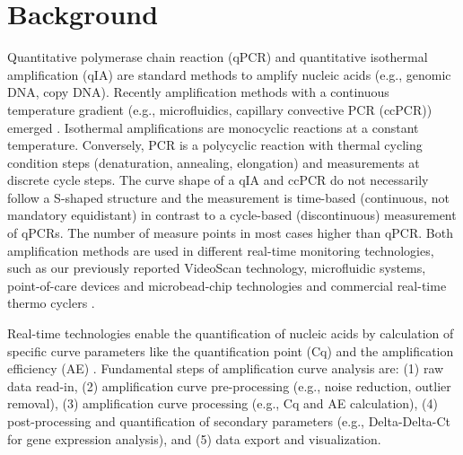\documentclass[twocolumn]{bmcart}%
\begin{document}

\section*{Background}

Quantitative polymerase chain reaction (qPCR) and quantitative isothermal 
amplification (qIA) are standard methods to amplify nucleic acids (e.g., genomic 
DNA, copy DNA). Recently amplification methods with a continuous temperature 
gradient (e.g., microfluidics, capillary convective PCR (ccPCR)) emerged 
\cite{bustin_miqe_2009, rodiger_nucleic_2014, chou_rapid_2011}. Isothermal 
amplifications are monocyclic reactions at a constant temperature. Conversely, 
PCR is a polycyclic reaction with thermal cycling condition steps (denaturation, 
annealing, elongation) and measurements at discrete cycle steps. The curve shape 
of a qIA and ccPCR do not necessarily follow a S-shaped structure and the 
measurement is time-based (continuous, not mandatory equidistant) in contrast to 
a cycle-based (discontinuous) measurement of qPCRs. The number of measure points 
in most cases higher than qPCR. Both amplification methods are used in different 
real-time monitoring technologies, such as our previously reported VideoScan 
technology, microfluidic systems, point-of-care devices and microbead-chip 
technologies and commercial real-time thermo cyclers \cite{chang_2012, 
roediger_highly_2013, roediger_bead_qPCR_2013, rodiger_nucleic_2014}.

Real-time technologies enable the quantification of nucleic acids by calculation 
of specific curve parameters like the quantification point (Cq) and the 
amplification efficiency (AE) \cite{ruijter_2013,tellinghuisen_2014}. 
Fundamental steps of amplification curve analysis are: (1) raw data read-in, (2) 
amplification curve pre-processing (e.g., noise reduction, outlier removal), (3) 
amplification curve processing (e.g., Cq and AE calculation), (4) 
post-processing and quantification of secondary parameters (e.g., Delta-Delta-Ct 
for gene expression analysis), and (5) data export and visualization.
\end{document}
